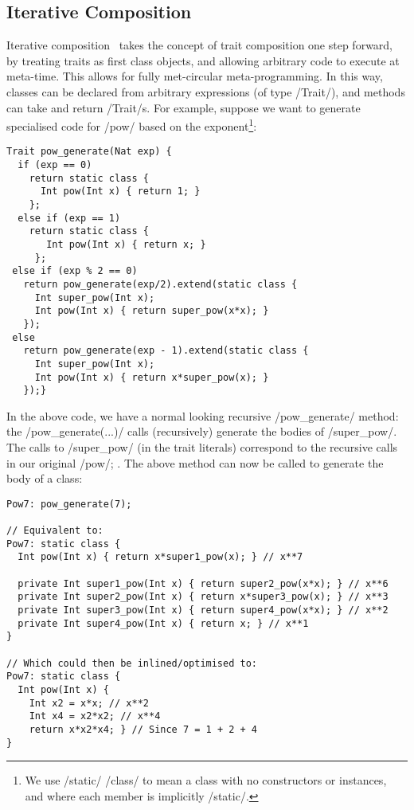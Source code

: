 \subsection{Iterative Composition}
Iterative composition~\cite{?} takes the concept of trait composition one step forward, by treating traits as first class objects, and allowing arbitrary code to execute at meta-time. This allows for fully met-circular meta-programming. In this way, classes can be declared from arbitrary expressions (of type /Trait/), and methods can take and return /Trait/s. For example, suppose we want to generate specialised code for /pow/ based on the exponent\footnote{We use /static/ /class/ to mean a class with no constructors or instances, and where each member is implicitly /static/.}:
\begin{lstlisting}
Trait pow_generate(Nat exp) {
  if (exp == 0)
    return static class { 
      Int pow(Int x) { return 1; }
    };
  else if (exp == 1)
    return static class {
       Int pow(Int x) { return x; }
     };
 else if (exp % 2 == 0)
   return pow_generate(exp/2).extend(static class {
     Int super_pow(Int x);
     Int pow(Int x) { return super_pow(x*x); }
   });
 else 
   return pow_generate(exp - 1).extend(static class {
     Int super_pow(Int x);
     Int pow(Int x) { return x*super_pow(x); }
   });}
\end{lstlisting}
In the above code, we have a normal looking recursive /pow_generate/ method: the /pow_generate(...)/ calls (recursively) generate the bodies of /super_pow/. The calls to /super_pow/ (in the trait literals) correspond to the recursive calls in our original /pow/; . The above method can now be called to generate the body of a class:

\begin{lstlisting}
Pow7: pow_generate(7);

// Equivalent to:
Pow7: static class {
  Int pow(Int x) { return x*super1_pow(x); } // x**7

  private Int super1_pow(Int x) { return super2_pow(x*x); } // x**6
  private Int super2_pow(Int x) { return x*super3_pow(x); } // x**3
  private Int super3_pow(Int x) { return super4_pow(x*x); } // x**2
  private Int super4_pow(Int x) { return x; } // x**1
}

// Which could then be inlined/optimised to:
Pow7: static class {
  Int pow(Int x) { 
    Int x2 = x*x; // x**2
    Int x4 = x2*x2; // x**4
    return x*x2*x4; } // Since 7 = 1 + 2 + 4
}
\end{lstlisting}

